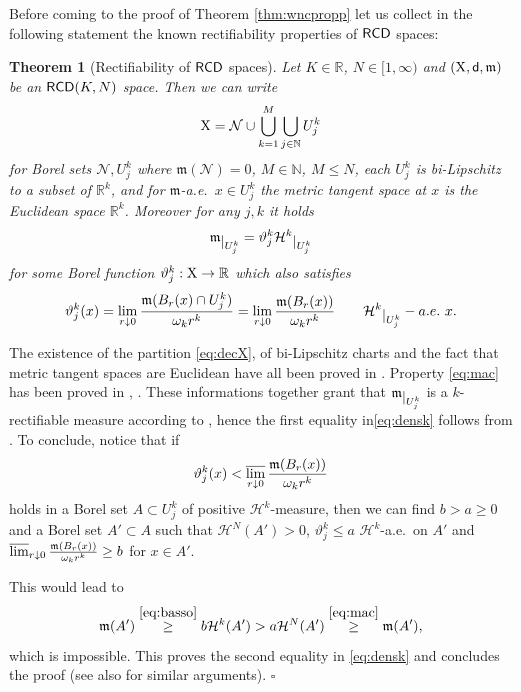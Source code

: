 \documentclass[reqno,11pt]{article}
\numberwithin{equation}{section}
\newcommand{\N}{\mathbb{N}}
\newcommand{\R}{\mathbb{R}}
\newcommand{\mm}{{\mbox{\boldmath$m$}}}
\newcommand{\sfd}{{\sf d}}
\newcommand{\restr}[1]{\lower3pt\hbox{$|_{#1}$}}
\newcommand{\lims}{\varlimsup}
\renewcommand{\mm}{\mathfrak m}                                %
\renewenvironment{proof}{\removelastskip\par\medskip   %
\noindent{\em Proof} \rm}{\penalty-20\null\hfill$\square$\par\medbreak}
\newtheorem{theorem}{Theorem}[section]
\newcommand{\X}{{\rm X}}
\newcommand{\RCD}{{\sf RCD}}
\newcommand{\HH}{{\mathcal H}}
\begin{document}
Before coming to the proof of Theorem \ref{thm:wncpropp} let us collect in the following statement the known rectifiability properties of $\RCD$ spaces:
\begin{theorem}[Rectifiability of $\RCD$ spaces]\label{thm:rett}
Let $K\in\R$, $N\in[1,\infty)$ and $(\X,\sfd,\mm)$ be an $\RCD(K,N)$ space. Then we can write
\begin{equation}
\label{eq:decX}
\X=\mathcal N\cup\bigcup_{k=1}^M\bigcup_{j\in \N} U^k_j
\end{equation}
for Borel sets $\mathcal N, U^k_j$ where  $\mm(\mathcal N)=0$,  \(M\in \N\), \(M\le N\),    each \(U^k_j\) is  bi-Lipschitz to a subset of \(\R^{k}\),  and for $\mm$-a.e.\ $x\in U^k_j$ the metric tangent space  at $x$ is the Euclidean space $\R^k$.
Moreover for any $j,k$ it holds
\begin{equation}
\label{eq:mac}
\mm \restr{ U^k_j}=\vartheta_j^k\HH^{k} \restr{ U^k_j}
\end{equation}
for some Borel function $\vartheta_j^k:\X\to\R$ which also satisfies
\begin{equation}
\label{eq:densk}
\vartheta_j^k(x)=\lim_{r\downarrow0}\frac{\mm(B_r(x)\cap U_j^k)}{\omega_kr^k}=\lim_{r\downarrow0}\frac{\mm(B_r(x))}{\omega_kr^k}\qquad \HH^k\restr{U_j^k}-a.e.\ x.
\end{equation} 
\end{theorem}
\begin{proof} The existence of the partition \eqref{eq:decX}, of bi-Lipschitz charts and the fact that metric tangent spaces are Euclidean have all been proved in  \cite{Mondino-Naber14}. Property \eqref{eq:mac} has been proved in  \cite{MK16}, \cite{GP16-2}. These informations together grant that $\mm\restr{U_j^k}$ is a $k$-rectifiable measure  according to \cite[Definition 5.3]{AmbKir00}, hence the first equality in\eqref{eq:densk} follows from  \cite[Theorem 5.4]{AmbKir00}. To conclude, notice that if 
\[
\vartheta_j^k(x)<\lims_{r\downarrow0}\frac{\mm(B_r(x))}{\omega_kr^k}
\]
holds in a Borel set $A\subset U_j^k$ of positive $\HH^k$-measure, then we can find $b>a\geq 0$ and a Borel set $A'\subset A$ such that $\HH^N(A')>0$,  $\vartheta_j^k\leq a$ $\HH^k$-a.e.\ on $A'$ and $\lims_{r\downarrow0}\frac{\mm(B_r(x))}{\omega_kr^k}\geq b$ for $x\in A'$. 

This would lead to 
\[
\mm(A')\stackrel{\eqref{eq:basso}}\geq b\HH^k(A')>a\HH^N(A')\stackrel{\eqref{eq:mac}}\geq  \mm(A'),
\]
which is impossible. This proves the second equality in \eqref{eq:densk} and concludes the proof { (see also \cite{AHT17} for similar arguments)}.
\end{proof}
\end{document}
